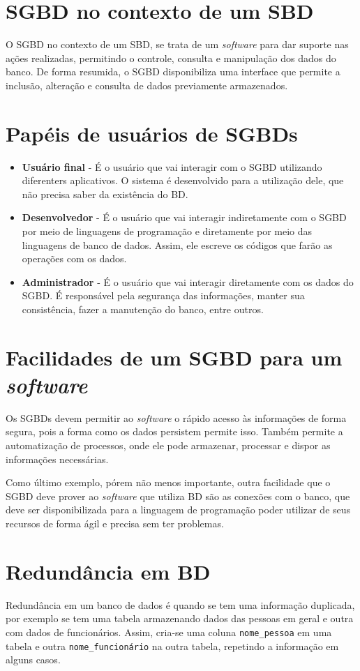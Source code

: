 \documentclass[12pt]{article}
\begin{document}
\section{SGBD no contexto de um SBD}
O SGBD no contexto de um SBD, se trata de um \textit{software} para dar suporte nas ações realizadas, permitindo o controle, consulta e manipulação dos dados do banco. De forma resumida, o SGBD disponibiliza uma interface que permite a inclusão, alteração e consulta de dados previamente armazenados.

\section{Papéis de usuários de SGBDs}
\begin{itemize}
    \item \textbf{Usuário final} - É o usuário que vai interagir com o SGBD utilizando diferenters aplicativos. O sistema é desenvolvido para a utilização dele, que não precisa saber da existência do BD.
    \item \textbf{Desenvolvedor} - É o usuário que vai interagir indiretamente com o SGBD por meio de linguagens de programação e diretamente por meio das linguagens de banco de dados. Assim, ele escreve os códigos que farão as operações com os dados.
    \item \textbf{Administrador} - É o usuário que vai interagir diretamente com os dados do SGBD. É responsável pela segurança das informações, manter sua consistência, fazer a manutenção do banco, entre outros.
\end{itemize}

\section{Facilidades de um SGBD para um \textit{software}}
Os SGBDs devem permitir ao \textit{software} o rápido acesso às informações de forma segura, pois a forma como os dados persistem permite isso. Também permite a automatização de processos, onde ele pode armazenar, processar e dispor as informações necessárias.

Como último exemplo, pórem não menos importante, outra facilidade que o SGBD deve prover ao \textit{software} que utiliza BD são as conexões com o banco, que deve ser disponibilizada para a linguagem de programação poder utilizar de seus recursos de forma ágil e precisa sem ter problemas.

\section{Redundância em BD}
Redundância em um banco de dados é quando se tem uma informação duplicada, por exemplo se tem uma tabela armazenando dados das pessoas em geral e outra com dados de funcionários. Assim, cria-se uma coluna \texttt{nome\_pessoa} em uma tabela e outra \texttt{nome\_funcionário} na outra tabela, repetindo a informação em alguns casos.
\end{document}
